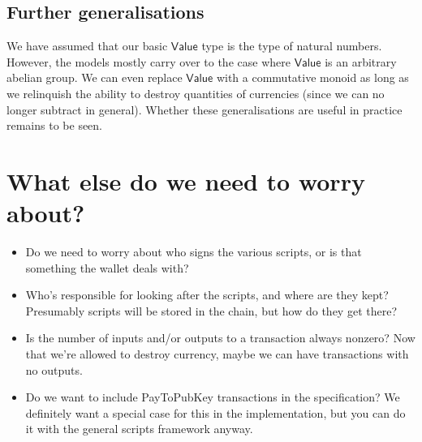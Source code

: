 \documentclass[a4paper]{article}
\newcommand{\s}{\textsf}  %
\theoremstyle{definition}  %
\newcommand{\valuetype}{\ensuremath{\s{Value}}}
\begin{document}
  
\subsection{Further generalisations}
We have assumed that our basic \valuetype{} type is the type of
natural numbers.  However, the models mostly carry over to the case
where \valuetype{} is an arbitrary abelian group\footnotemark.  We can
even replace \valuetype{} with a commutative monoid as long as we
relinquish the ability to destroy quantities of currencies (since we
can no longer subtract in general). Whether these generalisations are
useful in practice remains to be seen.




\section{What else do we need to worry about?}
\begin{itemize}
\item Do we need to worry about who signs the various scripts, or is that
  something the wallet deals with?

\item Who's responsible for looking after the scripts, and where are they kept?
  Presumably scripts will be stored in the chain, but how do they get there?

\item Is the number of inputs and/or outputs to a transaction always nonzero?
  Now that we're allowed to destroy currency, maybe we can have transactions
  with no outputs.

\item Do we want to include \s{PayToPubKey} transactions in the specification?
  We definitely want a special case for this in the implementation, but you
  can do it with the general scripts framework anyway.

\end{itemize}
  
\end{document}
